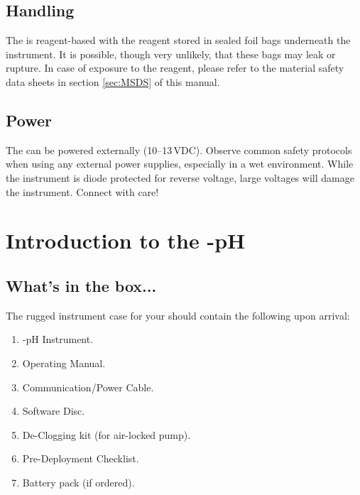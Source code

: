 \fi			%

\subsection*{Handling}

The \instType{} is reagent-based with the reagent stored in sealed foil bags underneath the instrument.  It is possible, though very unlikely, that these bags may leak or rupture. In case of exposure to the reagent, please refer to the material safety data sheets in section \ref{sec:MSDS} of this manual.


\subsection*{\instType{} Power}

The \instType{} can be powered externally (10--13\,VDC). Observe common safety protocols when using any external power supplies, especially in a wet environment.  While the instrument is diode protected for reverse voltage, large voltages will damage the instrument.  Connect with care!


\section{Introduction to the \instType{}-pH}

\subsection{What's in the box...}

The rugged instrument case for your \instType{} should contain the following upon arrival:

\ifcase \inst	%
    \begin{enumerate}
    \item \instType{}-pH Instrument.
    \item \instType{} Operating Manual.
    \item Communication/Power Cable.
    \item \instType{} Software Disc.
    \item De-Clogging kit (for air-locked pump).
    \item Pre-Deployment Checklist.
    \item Battery pack (if ordered).
    \end{enumerate}

